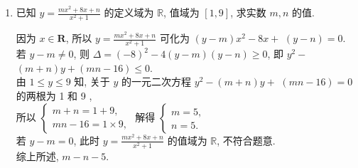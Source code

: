 \begin{enumerate}
\begin{jieda}
\begin{enumerate}
\item 当$x>1$时, $y=\sqrt{\dfrac{x^2+1}{x^2-2x+1}}=\sqrt{1+\dfrac{2x}{x^2-2x+1}}=\sqrt{1+\dfrac{2}{x+\frac{1}{x}-2}}\in(1,+\infty)$. \\
当$x<1$时, $y=-\sqrt{\dfrac{x^2+1}{x^2-2x+1}}=-\sqrt{1+\dfrac{2x}{x^2-2x+1}}$. \\
再分为$(-\infty,0)\cup\{0\}\cup(0,1)$讨论可得$y\in(-\infty,-\frac{1}{\sqrt{2}}]$. \\
综上, $y\in(-\infty,-\frac{1}{\sqrt{2}}]\cup(1,+\infty)$. \\
\ps 可化为$ax+\frac{b}{x}$的. \\
\ps 对于$f(x)=\dfrac{x}{x^2+1}$而言, 在$(-\infty,-1]$上$\searrow$, 在$[-1,1]$上$\nearrow$, 在$[1,+\infty)$上$\searrow$. \\
\ps 三角换元: 令$x=\tan\theta$, 其中$\theta\in(-\frac{\pi}{2},\frac{\pi}{4})\cup(\frac{\pi}{4},\frac{\pi}{2})$. \\
于是$y=\dfrac{\sec\theta}{\tan\theta-1}=\dfrac{1}{\sin\theta-\cos\theta}=\dfrac{1}{\sqrt{2}\sin(\theta-\frac{\pi}{4})}$. %
\end{enumerate}
\end{jieda}
\begin{vspace_}
\vsp[6]
\end{vspace_}

\item 已知 $y=\frac{m x^2+8 x+n}{x^2+1}$ 的定义域为 $\mathbb{R}$, 值域为 $[1,9]$, 求实数 $m, n$ 的值.
\begin{jieda}
因为 $x \in \mathbf{R}$, 所以 $y=\frac{m x^2+8 x+n}{x^2+1}$ 可化为 $(y-m) x^2-8 x+$ $(y-n)=0$.\\
若 $y-m \neq 0$, 则 $\Delta=(-8)^2-4(y-m)(y-n) \geqslant 0$, 即 $y^2-$ $(m+n) y+(m n-16) \leqslant 0$.\\
由 $1 \leqslant y \leqslant 9$ 知, 关于 $y$ 的一元二次方程 $y^2-(m+n) y+$ $(m n-16)=0$ 的两根为 1 和 9 ,\\
所以 $\left\{\begin{array}{l}m+n=1+9, \\ m n-16=1 \times 9,\end{array}\right.$ 解得 $\left\{\begin{array}{l}m=5, \\ n=5 .\end{array}\right.$\\
若 $y-m=0$, 此时 $y=\frac{m x^2+8 x+n}{x^2+1}$ 的值域为 $\mathbb{R}$, 不符合题意.\\
综上所述, $m-n-5$.
\end{jieda}
\begin{vspace_}
\vsp[5]
\end{vspace_}



\end{enumerate}
